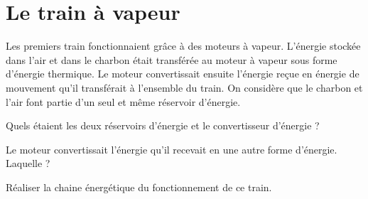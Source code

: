 \section{Le train à vapeur}\label{ex:train}

Les premiers train fonctionnaient grâce à des moteurs à vapeur. 
L'énergie stockée dans l'air et 
dans le charbon était transférée au moteur à vapeur sous forme d'énergie thermique.
Le moteur convertissait ensuite l'énergie reçue en énergie de mouvement qu'il transférait à l'ensemble du train. On considère que le charbon et l'air font partie d'un seul et même  réservoir d'énergie.

\begin{questions}
	\question Quels étaient les deux réservoirs d'énergie et le convertisseur d'énergie ?
	
	\question Le moteur convertissait l'énergie qu'il recevait en une autre forme d'énergie. Laquelle ?
	
	\question Réaliser la chaine énergétique du fonctionnement de ce train. 
\end{questions}